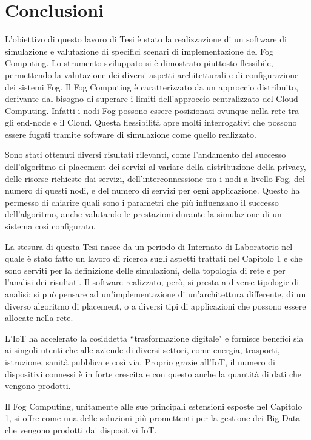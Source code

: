 \chapter*{Conclusioni}
\markboth{}{}

L'obiettivo di questo lavoro di Tesi è stato la realizzazione di un software di simulazione e valutazione di specifici scenari di implementazione del Fog Computing. Lo strumento sviluppato si è dimostrato piuttosto flessibile, permettendo la valutazione dei diversi aspetti architetturali e di configurazione dei sistemi Fog. Il Fog Computing è caratterizzato da un approccio distribuito, derivante dal bisogno di superare i limiti dell'approccio centralizzato del Cloud Computing. Infatti i nodi Fog possono essere posizionati ovunque nella rete tra gli end-node e il Cloud. Questa flessibilità apre molti interrogativi che possono essere fugati tramite software di simulazione come quello realizzato. 

Sono stati ottenuti diversi risultati rilevanti, come l'andamento del successo dell'algoritmo di placement dei servizi al variare della distribuzione della privacy, delle risorse richieste dai servizi, dell'interconnessione tra i nodi a livello Fog, del numero di questi nodi, e del numero di servizi per ogni applicazione. Questo ha permesso di chiarire quali sono i parametri che più influenzano il successo dell'algoritmo, anche valutando le prestazioni durante la simulazione di un sistema così configurato.

La stesura di questa Tesi nasce da un periodo di Internato di Laboratorio nel quale è stato fatto un lavoro di ricerca sugli aspetti trattati nel Capitolo 1 e che sono serviti per la definizione delle simulazioni, della topologia di rete e per l'analisi dei risultati. Il software realizzato, però, si presta a diverse tipologie di analisi: si può pensare ad un'implementazione di un'architettura differente, di un diverso algoritmo di placement, o a diversi tipi di applicazioni che possono essere allocate nella rete. 

L'IoT ha accelerato la cosiddetta ``trasformazione digitale" e fornisce benefici sia ai singoli utenti che alle aziende di diversi settori, come energia, trasporti, istruzione, sanità pubblica e così via. Proprio grazie all'IoT, il numero di dispositivi connessi è in forte crescita e con questo anche la quantità di dati che vengono prodotti.

Il Fog Computing, unitamente alle sue principali estensioni esposte nel Capitolo 1, si offre come una delle soluzioni più promettenti per la gestione dei Big Data che vengono prodotti dai dispositivi IoT.









